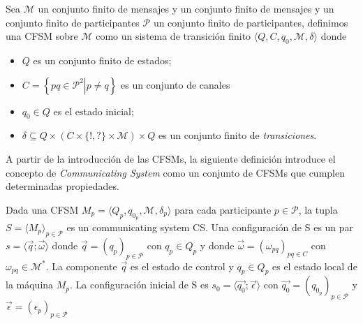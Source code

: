 \begin{definition} Sea $\mathcal{M}$ un conjunto finito de mensajes y un conjunto finito de mensajes  y un conjunto finito de participantes $\mathcal{P}$ un conjunto finito de participantes, definimos una CFSM sobre $\mathcal{M}$ como un sistema de transición finito $\langle Q, C, q_0, \mathcal{M}, \delta \rangle$ donde
\begin{itemize}
  \item $Q$ es un conjunto finito de estados;
  \item $C = \left\{ pq \in \mathcal{P}^2 \left|\right. p \not= q\right\}$ es un conjunto de canales
  \item $q_0 \in Q$ es el estado inicial;
  \item $\delta \subseteq Q \times (C \times \{!,?\} \times \mathcal{M}) \times Q$ es un conjunto finito de \emph{transiciones}.
  \end{itemize}
  
\end{definition} 

A partir de la introducción de las CFSMs, la siguiente definición introduce el concepto de \emph{Communicating System} \cite[Def.2.2]{GMC} como un conjunto de CFSMs que cumplen determinadas propiedades.

\begin{definition} Dada una CFSM $\textit{M}_p = \langle Q_p, q_{0_p}, \mathcal{M}, \delta_p \rangle $ para cada participante $p \in \mathcal{P}$, la tupla $S= \langle M_p \rangle_{p \in \mathcal{P}} $ es un communicating system CS.
Una configuración de S es un par $s = \langle \overrightarrow{q} ; \overrightarrow{\omega} \rangle$ donde $\overrightarrow{q} = (q_p)_{p \in \mathcal{P}}$ con $q_p \in Q_p$ y donde $\overrightarrow{\omega} = (\omega_{pq})_{pq \in C}$ con $\omega_{pq} \in \mathcal{M}^*$. La componente $\overrightarrow{q}$ es el estado de control y $q_p \in Q_p$ es el estado local de la máquina $ M_p$. La configuración inicial de S es $s_0 = \langle \overrightarrow{q_0} ; \overrightarrow{\epsilon} \rangle$ con $\overrightarrow{q_0} = (q_{0_p})_{p \in \mathcal{P}}$ y $\overrightarrow{\epsilon} = (\epsilon_p)_{p \in \mathcal{P}}$

\end{definition}

